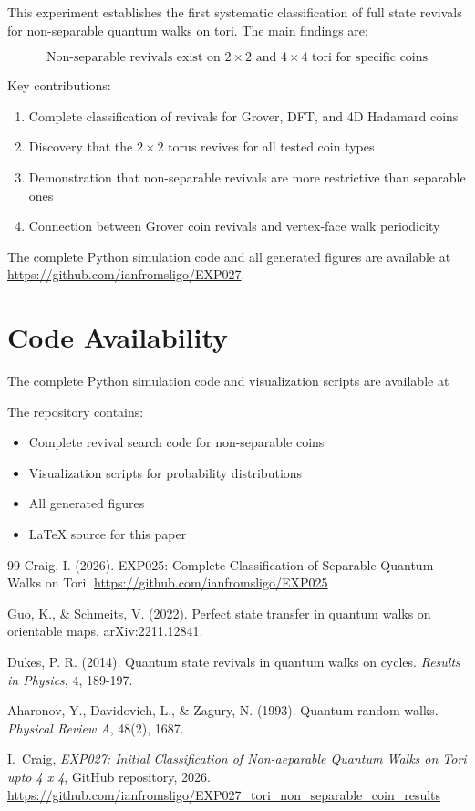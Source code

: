\documentclass[12pt]{article}
\begin{document}
This experiment establishes the first systematic classification of full state revivals for non-separable quantum walks on tori. The main findings are:

\[
\boxed{\text{Non-separable revivals exist on } 2 \times 2 \text{ and } 4 \times 4 \text{ tori for specific coins}}
\]

Key contributions:

\begin{enumerate}
    \item Complete classification of revivals for Grover, DFT, and 4D Hadamard coins
    \item Discovery that the $2 \times 2$ torus revives for all tested coin types
    \item Demonstration that non-separable revivals are more restrictive than separable ones
    \item Connection between Grover coin revivals and vertex-face walk periodicity
\end{enumerate}

The complete Python simulation code and all generated figures are available at \url{https://github.com/ianfromsligo/EXP027}.

\section*{Code Availability}

The complete Python simulation code and visualization scripts are available at \cite{exp027}

The repository contains:
\begin{itemize}
    \item Complete revival search code for non-separable coins
    \item Visualization scripts for probability distributions
    \item All generated figures
    \item LaTeX source for this paper
\end{itemize}

\begin{thebibliography}{99}
Craig, I. (2026). EXP025: Complete Classification of Separable Quantum Walks on Tori. \url{https://github.com/ianfromsligo/EXP025}

Guo, K., \& Schmeits, V. (2022). Perfect state transfer in quantum walks on orientable maps. arXiv:2211.12841.

Dukes, P. R. (2014). Quantum state revivals in quantum walks on cycles. \textit{Results in Physics}, 4, 189-197.

Aharonov, Y., Davidovich, L., \& Zagury, N. (1993). Quantum random walks. \textit{Physical Review A}, 48(2), 1687.

I.~Craig,
\textit{EXP027: Initial Classification of Non-aeparable Quantum Walks on Tori upto 4 x 4},
GitHub repository, 2026. \url{https://github.com/ianfromsligo/EXP027_tori_non_separable_coin_results}

\end{thebibliography}
\end{document}
